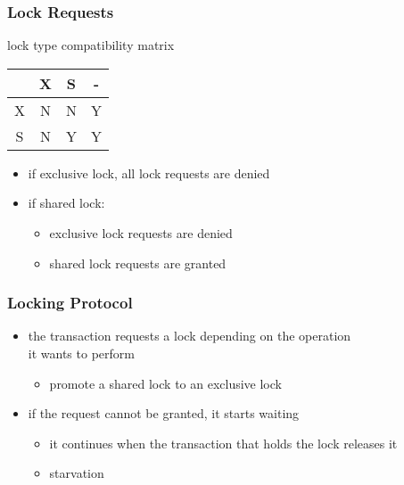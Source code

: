 \documentclass[dvipsnames]{beamer}
\theoremstyle{plain}
\begin{document}
\begin{frame}
  \frametitle{Lock Requests}

  \begin{block}{lock type compatibility matrix}
    \begin{table}
      \begin{tabular}{|c||c|c|c|}\hline
  & X & S & -\\\hline\hline
X & N & N & Y\\\hline
S & N & Y & Y\\\hline
      \end{tabular}
    \end{table}
  \end{block}

  \begin{itemize}
    \item if exclusive lock, all lock requests are denied

    \pause
    \item if shared lock:
    \begin{itemize}
      \item exclusive lock requests are denied
      \item shared lock requests are granted
    \end{itemize}
  \end{itemize}
\end{frame}

\begin{frame}
  \frametitle{Locking Protocol}

  \begin{itemize}
    \item the transaction requests a lock depending on the operation\\
      it wants to perform
    \begin{itemize}
      \item promote a shared lock to an exclusive lock
    \end{itemize}

    \pause
    \item if the request cannot be granted, it starts waiting
    \begin{itemize}
      \item it continues when the transaction that holds the lock releases it
      \item \alert{starvation}
    \end{itemize}
  \end{itemize}
\end{frame}
\end{document}
